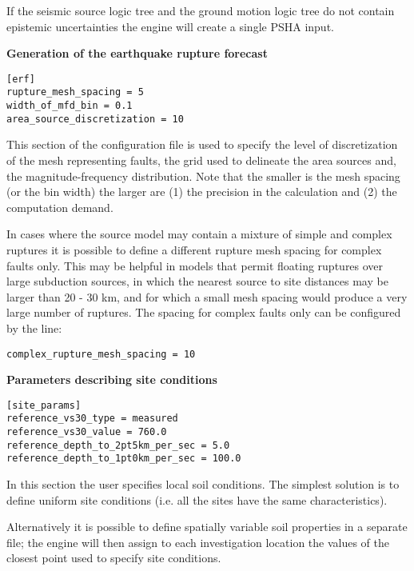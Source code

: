 If the seismic source logic tree and the ground motion logic tree do not
contain epistemic uncertainties the engine will create a single PSHA input.

\textbf{Generation of the earthquake rupture forecast}

\begin{verbatim}
[erf]
rupture_mesh_spacing = 5
width_of_mfd_bin = 0.1
area_source_discretization = 10
\end{verbatim}

This section of the configuration file is used to specify the level of
discretization of the mesh representing faults, the grid used to delineate the area sources and, the magnitude-frequency distribution. Note that the smaller is the mesh spacing (or the bin width) the larger are (1) the precision in the calculation and (2) the computation demand.

In cases where the source model may contain a mixture of simple and complex ruptures it is possible to define a different rupture mesh spacing for complex faults only. This may be helpful in models that permit floating ruptures over large subduction sources, in which the nearest source to site distances may be larger than 20 - 30 km, and for which a small mesh spacing would produce a very large number of ruptures. The spacing for complex faults only can be configured by the line:

\begin{verbatim}
complex_rupture_mesh_spacing = 10
\end{verbatim}

\textbf{Parameters describing site conditions}

\begin{verbatim}
[site_params]
reference_vs30_type = measured
reference_vs30_value = 760.0
reference_depth_to_2pt5km_per_sec = 5.0
reference_depth_to_1pt0km_per_sec = 100.0
\end{verbatim}

In this section the user specifies local soil conditions. The simplest
solution is to define uniform site conditions (i.e. all the sites have  the
same characteristics).

Alternatively it is possible to define  spatially variable soil properties in
a separate file; the engine will then assign to each investigation location
the values of the closest point used to specify site conditions.

